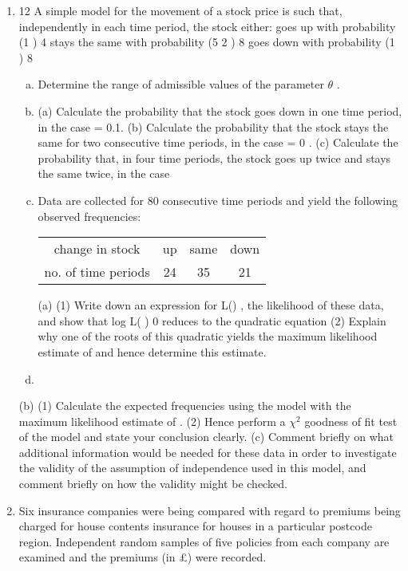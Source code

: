 \documentclass[a4paper,12pt]{article}
\begin{document}
\begin{enumerate}
\item 12 A simple model for the movement of a stock price is such that, independently in each
time period, the stock either:
goes up with probability (1 )
4
stays the same with probability (5 2 )
8
goes down with probability (1 )
8
\begin{enumerate}[(a)]

\item Determine the range of admissible values of the parameter $\theta$ . 
\item (a) Calculate the probability that the stock goes down in one time period, in the case  = 0.1.
(b) Calculate the probability that the stock stays the same for two consecutive time periods, in the case  = 0 .
(c) Calculate the probability that, in four time periods, the stock goes up twice and stays the same twice, in the case  %
\item Data are collected for 80 consecutive time periods and yield the following
observed frequencies:

\begin{center}
\begin{tabular}{|c|c|c|c|}
change in stock & up & same &  down\\
no. of time periods & 24 & 35 & 21 \\
\end{tabular}
\end{center}

(a) (1) Write down an expression for L() , the likelihood of these
data, and show that
log L( ) 0 %
reduces to the quadratic equation
(2) Explain why one of the roots of this quadratic yields the
maximum likelihood estimate of  and hence determine this
estimate. 
    \item 
\end{enumerate}
(b) (1) Calculate the expected frequencies using the model with the
maximum likelihood estimate of .
(2) Hence perform a $\chi^2$ goodness of fit test of the model and state
your conclusion clearly. 
(c) Comment briefly on what additional information would be needed for
these data in order to investigate the validity of the assumption of
independence used in this model, and comment briefly on how the
validity might be checked. 
\item  Six insurance companies were being compared with regard to premiums being
charged for house contents insurance for houses in a particular postcode region.
Independent random samples of five policies from each company are examined and
the premiums (in £) were recorded.


\end{enumerate}
\end{document}
